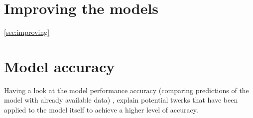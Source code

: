 \section{Improving the models}
\ref{sec:improving}

\section{Model accuracy}
Having a look at the model performance accuracy (comparing predictions of the model with already available data) , explain potential twerks that have been applied to the model itself to achieve a higher level of accuracy.

